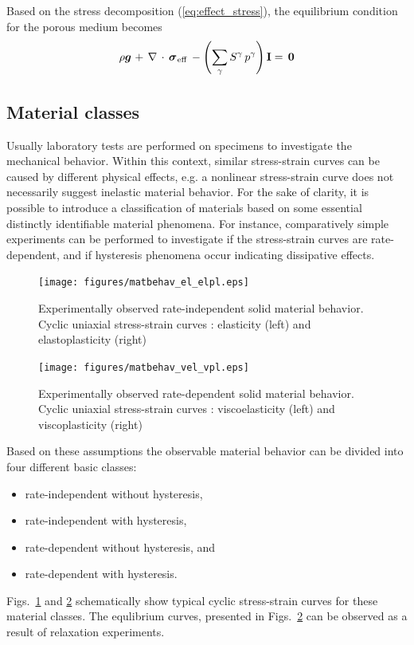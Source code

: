 Based on the stress decomposition (\ref{eq:effect_stress}), the equilibrium condition for the porous medium becomes
\begin{equation}
\rho \mio{g}{}{}
+
\,\nabla\,\cdot\,\miu{\sigma}{\mathrm{eff}}{}{}\,
-
\left(\sum\limits_{\gamma}S^{\gamma}\,p^{\gamma}\right)\mathbf{I}
=
\,\mathbf{0}
\label{eq:equi_mod}
\end{equation}

\subsection{Material classes}
\label{sec:matclass}

Usually laboratory tests are performed on specimens to investigate the mechanical behavior. Within this context, similar stress-strain curves can be caused by different physical effects, e.g. a nonlinear stress-strain curve does not necessarily suggest inelastic material behavior. For the sake of clarity, it is possible to introduce a classification of materials based on some essential distinctly identifiable material phenomena. For instance, comparatively simple experiments can be performed to investigate if the stress-strain curves are rate-dependent, and if hysteresis phenomena occur indicating dissipative effects.

\begin{figure}[htb!]
\begin{center}
\footnotesize
\texttt{[image: figures/matbehav\_el\_elpl.eps]}
\caption{Experimentally observed rate-independent solid material behavior. Cyclic uniaxial stress-strain curves \cite{Haupt:2002}: elasticity (left) and elastoplasticity (right)}
\label{fig:matbehav_el_elpl}
\end{center}
\end{figure}
\begin{figure}[htb!]
\begin{center}
\footnotesize
\texttt{[image: figures/matbehav\_vel\_vpl.eps]}
\caption{Experimentally observed rate-dependent solid material behavior. Cyclic uniaxial stress-strain curves \cite{Haupt:2002}: viscoelasticity (left) and viscoplasticity (right)}
\label{fig:matbehav_vel_vpl}
\end{center}
\end{figure}

\newpage

Based on these assumptions the observable material behavior can be divided into four different basic classes:
\begin{itemize}
\item rate-independent without hysteresis,
\item rate-independent with hysteresis,
\item rate-dependent without hysteresis, and
\item rate-dependent with hysteresis.
\end{itemize}
Figs.~\ref{fig:matbehav_el_elpl} and \ref{fig:matbehav_vel_vpl} schematically show typical cyclic stress-strain curves for these material classes. The equlibrium curves, presented in Figs.~\ref{fig:matbehav_vel_vpl} can be observed as a result of relaxation experiments.

